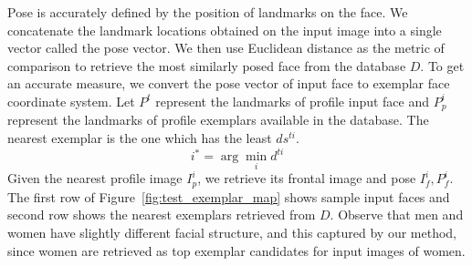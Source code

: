 Pose is accurately defined by the position of landmarks on the face. We concatenate the landmark
locations obtained on the input image into a single vector called  the
pose vector. We then use Euclidean distance as the metric of comparison to retrieve the most
similarly posed face from the database $D$. To get an accurate measure, we convert the pose vector of input face to
exemplar face coordinate system. Let $P^t$ represent the landmarks of profile
input face and $P_p^i$ represent the landmarks of profile exemplars available in the database. 
The nearest exemplar is the one which has the least $ds^{ti}$. 
\begin{equation}
  i^* = \arg \min_{i} d^{ti}
\end{equation}
Given the nearest profile image $I_p^i$, we retrieve its frontal image and pose $I_f^i, P_f^i$.
The first row of Figure~\ref{fig:test_exemplar_map} shows sample input faces and second row shows the
nearest exemplars retrieved from $D$. Observe that men and women have slightly different facial
structure, and this captured by our method, since women are retrieved as top exemplar candidates for
input images of women. 
